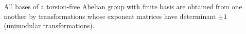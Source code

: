 All bases of a torsion-free Abelian group with finite basis are obtained from one another by transformations whose exponent matrices have determinant $\pm 1$ (unimodular transformations).
